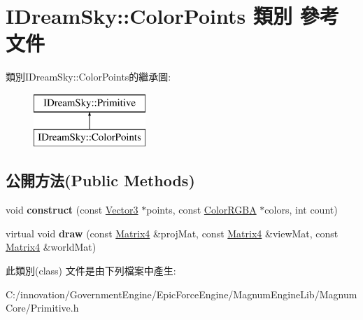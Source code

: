 \hypertarget{class_i_dream_sky_1_1_color_points}{}\section{I\+Dream\+Sky\+:\+:Color\+Points 類別 參考文件}
\label{class_i_dream_sky_1_1_color_points}
類別\+I\+Dream\+Sky\+:\+:Color\+Points的繼承圖\+:\begin{figure}[H]
\begin{center}
\leavevmode
\includegraphics[height=2.000000cm]{class_i_dream_sky_1_1_color_points}
\end{center}
\end{figure}
\subsection*{公開方法(Public Methods)}
\begin{DoxyCompactItemize}
\item 
void {\bfseries construct} (const \hyperlink{class_i_dream_sky_1_1_vector3}{Vector3} $\ast$points, const \hyperlink{class_i_dream_sky_1_1_color_r_g_b_a}{Color\+R\+G\+BA} $\ast$colors, int count)\hypertarget{class_i_dream_sky_1_1_color_points_a68ed9110fa29b65f4386dc9703400900}{}\label{class_i_dream_sky_1_1_color_points_a68ed9110fa29b65f4386dc9703400900}

\item 
virtual void {\bfseries draw} (const \hyperlink{class_i_dream_sky_1_1_matrix4}{Matrix4} \&proj\+Mat, const \hyperlink{class_i_dream_sky_1_1_matrix4}{Matrix4} \&view\+Mat, const \hyperlink{class_i_dream_sky_1_1_matrix4}{Matrix4} \&world\+Mat)\hypertarget{class_i_dream_sky_1_1_color_points_aaf673b96a6c059c7cd97626edf891082}{}\label{class_i_dream_sky_1_1_color_points_aaf673b96a6c059c7cd97626edf891082}

\end{DoxyCompactItemize}


此類別(class) 文件是由下列檔案中產生\+:\begin{DoxyCompactItemize}
\item 
C\+:/innovation/\+Government\+Engine/\+Epic\+Force\+Engine/\+Magnum\+Engine\+Lib/\+Magnum\+Core/Primitive.\+h\end{DoxyCompactItemize}

